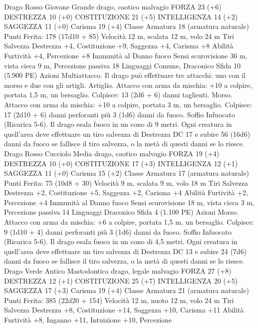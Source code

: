 \begin{multicols}{2}
Drago Rosso Giovane
Grande drago, caotico malvagio
FORZA 23 (+6)
DESTREZZA 10 (+0)
COSTITUZIONE 21 (+5)
INTELLIGENZA 14 (+2)
SAGGEZZA 11 (+0)
Carisma 19 (+4)
Classe Armatura 18 (armatura naturale)
\hspace*{0pt}\hfill{Punti Ferita}: 178 (17d10 + 85)
Velocità 12 m, scalata 12 m, volo 24 m
Tiri Salvezza Destrezza +4, Costituzione +9, Saggezza +4,
Carisma +8
Abilità Furtività +4, Percezione +8
Immunità al Danno fuoco
Sensi scurovisione 36 m, vista cieca 9 m, Percezione passiva 18
Linguaggi Comune, Draconico
Sfida 10 (5.900 PE)
Azioni
Multiattacco. Il drago può effettuare tre attacchi: uno con il
morso e due con gli artigli.
Artiglio. Attacco con arma da mischia: +10 a colpire, portata 1,5
m, un bersaglio.
Colpisce: 13 (2d6 + 6) danni taglienti.
Morso. Attacco con arma da mischia: +10 a colpire, portata 3 m,
un bersaglio.
Colpisce: 17 (2d10 + 6) danni perforanti più 3 (1d6) danni da
fuoco.
Soffio Infuocato (Ricarica 5-6). Il drago esala fuoco in un cono
di 9 metri. Ogni creatura in quell’area deve effettuare un tiro
salvezza di Destrezza DC 17 e subire 56 (16d6) danni da fuoco
se fallisce il tiro salvezza, o la metà di questi danni se lo riesce.
Drago Rosso Cucciolo
Media drago, caotico malvagio
FORZA 19 (+4)
DESTREZZA 10 (+0)
COSTITUZIONE 17 (+3)
INTELLIGENZA 12 (+1)
SAGGEZZA 11 (+0)
Carisma 15 (+2)
Classe Armatura 17 (armatura naturale)
\hspace*{0pt}\hfill{Punti Ferita}: 75 (10d8 + 30)
Velocità 9 m, scalata 9 m, volo 18 m
Tiri Salvezza Destrezza +2, Costituzione +5, Saggezza +2,
Carisma +4
Abilità Furtività +2, Percezione +4
Immunità al Danno fuoco
Sensi scurovisione 18 m, vista cieca 3 m, Percezione passiva 14
Linguaggi Draconico
Sfida 4 (1.100 PE)
Azioni
Morso. Attacco con arma da mischia: +6 a colpire, portata 1,5
m, un bersaglio.
Colpisce: 9 (1d10 + 4) danni perforanti più 3 (1d6) danni da
fuoco.
Soffio Infuocato (Ricarica 5-6). Il drago esala fuoco in un cono
di 4,5 metri. Ogni creatura in quell’area deve effettuare un tiro
salvezza di Destrezza DC 13 e subire 24 (7d6) danni da fuoco se
fallisce il tiro salvezza, o la metà di questi danni se lo riesce.
Drago Verde Antico
Mastodontica drago, legale malvagio
FORZA 27 (+8)
DESTREZZA 12 (+1)
COSTITUZIONE 25 (+7)
INTELLIGENZA 20 (+5)
SAGGEZZA 17 (+3)
Carisma 19 (+4)
Classe Armatura 21 (armatura naturale)
\hspace*{0pt}\hfill{Punti Ferita}: 385 (22d20 + 154)
Velocità 12 m, nuoto 12 m, volo 24 m
Tiri Salvezza Destrezza +8, Costituzione +14, Saggezza +10,
Carisma +11
Abilità Furtività +8, Inganno +11, Intuizione +10, Percezione

\end{multicols}
